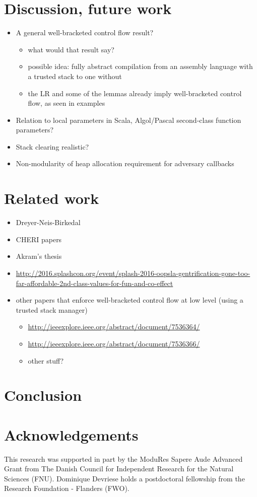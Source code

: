 \documentclass[compsoc,conference,letterpaper,fleqn]{IEEEtran}
\begin{document}
\section{Discussion, future work}
\begin{itemize}
\item A general well-bracketed control flow result?
\begin{itemize}
\item what would that result say?
\item possible idea: fully abstract compilation from an assembly language with
a trusted stack to one without
\item the LR and some of the lemmas already imply well-bracketed control flow, as seen in examples
\end{itemize}
\item Relation to local parameters in Scala, Algol/Pascal second-class function parameters?
\item Stack clearing realistic?
\item Non-modularity of heap allocation requirement for adversary callbacks
\end{itemize}

\section{Related work}

\begin{itemize}
\item Dreyer-Neis-Birkedal
\item CHERI papers
\item Akram's thesis
\item \url{http://2016.splashcon.org/event/splash-2016-oopsla-gentrification-gone-too-far-affordable-2nd-class-values-for-fun-and-co-effect}
\item other papers that enforce well-bracketed control flow at low level
(using a trusted stack manager)
\begin{itemize}
\item \url{http://ieeexplore.ieee.org/abstract/document/7536364/}
\item \url{http://ieeexplore.ieee.org/abstract/document/7536366/}
\item other stuff?
\end{itemize}
\end{itemize}

\section{Conclusion}

\section*{Acknowledgements}
\label{sec:acknowledgements}

This research was supported in part by the ModuRes Sapere Aude Advanced Grant from The Danish Council for Independent Research for the Natural Sciences (FNU).
Dominique Devriese holds a postdoctoral fellowship from the Research Foundation - Flanders (FWO).



\end{document}
